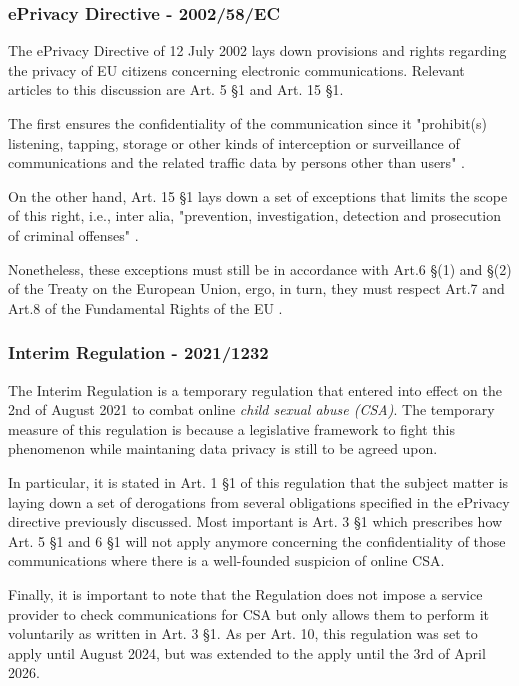\subsubsection{ePrivacy Directive - 2002/58/EC}

The ePrivacy Directive of 12 July 2002 lays down provisions and rights regarding the privacy of EU citizens concerning electronic communications. Relevant articles to this discussion are Art. 5 \S 1 and Art. 15 \S 1.

The first ensures the confidentiality of the communication since it "prohibit(s) listening, tapping, storage or other kinds of interception or surveillance of communications and the related traffic data by persons other than users" \cite{ePrivacy}. 

On the other hand, Art. 15 \S 1 lays down a set of exceptions that limits the scope of this right, i.e., inter alia, "prevention, investigation, detection and prosecution of criminal offenses" \cite{ePrivacy}. 

Nonetheless, these exceptions must still be in accordance with Art.6 \S(1) and \S(2) of the Treaty on the European Union, ergo, in turn, they must respect Art.7 and Art.8 of the Fundamental Rights of the EU \cite{ePrivacy} \cite{eu_charter_fundamental_rights} \cite{teu}.

\subsubsection{Interim Regulation - 2021/1232}

The Interim Regulation is a temporary regulation that entered into effect on the 2nd of August 2021 to combat online \textit{child sexual abuse (CSA)}. The temporary measure of this regulation is because a legislative framework to fight this phenomenon while maintaning data privacy is still to be agreed upon.

In particular, it is stated in Art. 1 \S 1 of this regulation that the subject matter is laying down a set of derogations from several obligations specified in the ePrivacy directive previously discussed\cite{interim_regualtion}. Most important is Art. 3 \S 1 which prescribes how Art. 5 \S 1 and 6 \S 1 will not apply anymore concerning the confidentiality of those communications where there is a well-founded suspicion of online CSA\cite{interim_regualtion}.

Finally, it is important to note that the Regulation does not impose a service provider to check communications for CSA but only allows them to perform it voluntarily as written in Art. 3 \S 1\cite{interim_regualtion}. As per Art. 10, this regulation was set to apply until August 2024, but was extended to the apply until the 3rd of April 2026\cite{interim_regualtion}.

